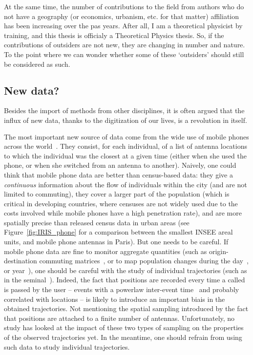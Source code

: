 At the same time, the number of contributions to the field from authors who do
not have a geography (or economics, urbanism, etc. for that matter) affiliation
has been increasing over the pas years. After all, I am a theoretical physicist
by training, and this thesis is officialy a Theoretical Physics thesis. So, if
the contributions of outsiders are not new, they are changing in number and
nature. To the point where we can wonder whether some of these `outsiders'
should still be considered as such.



\subsection{New data?}
\label{sub:new_data}

Besides the import of methods from other disciplines, it is often argued that
the influx of new data, thanks to the digitization of our lives, is a revolution
in itself. 

The most important new source of data come from the wide use of mobile phones
across the world~\cite{Gonzalez:2008,Fen-Chong:2012}. They consist, for each individual, of a
list of antenna locations to which the individual was the closest at a given time
(either when she used the phone, or when she switched from an antenna to another).
Naively, one could think that mobile phone data are better than census-based
data: they give a \emph{continuous} information about the flow of individuals
within the city (and are not limited to commuting), they cover a larger part of
the population (which is critical in developing countries, where censuses are not
widely used due to the costs involved while mobile phones have a high
penetration rate), and are more spatially precise than released census data in
urban areas (see Figure~\ref{fig:IRIS_phone} for a comparison between the smallest
INSEE areal units, and mobile phone antennas in Paris). But one needs to be
careful. If mobile phone data are fine to monitor aggregate quantities (such as
origin-destination commuting matrices~\cite{Lenormand:2014}, or to map
population changes during the day~\cite{Louail:2014}, or year~\cite{Deville:2014}), one should be careful with the study of
individual trajectories (such as in the
seminal~\cite{Gonzalez:2008,Song:2010_modelling,Song:2010_limits}). Indeed, the
fact that positions are recorded every time a called is passed by the user -- 
events with a powerlaw inter-event time~\cite{Song:2010_modelling} and 
probably correlated with locations -- is likely to introduce an important biais in
the obtained trajectories. Not mentioning the spatial sampling introduced by the
fact that positions are attached to a finite number of antennas. Unfortunately,
no study has looked at the impact of these two types of sampling on the
properties of the observed trajectories yet. In the meantime, one should refrain
from using such data to study individual trajectories.

